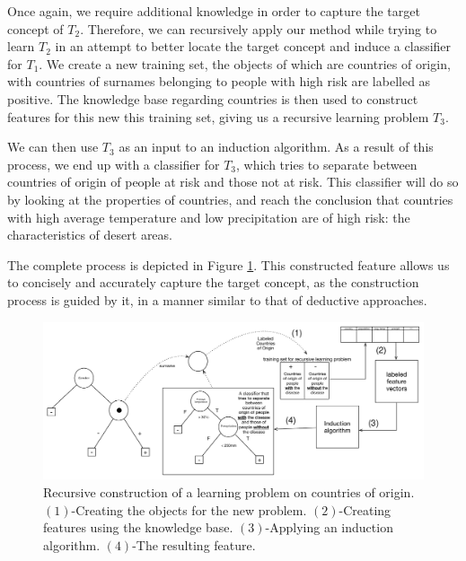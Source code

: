 \documentclass{article}
\theoremstyle{definition}
\begin{document}
Once again, we require additional knowledge in order to capture the target concept of $T_2$. 
Therefore, we can recursively apply our method while trying to learn $T_2$ in an attempt to better locate the target concept and induce a classifier for $T_1$.
We create a new training set, the objects of which are countries of origin, with countries of surnames belonging to people with high risk are labelled as positive. The knowledge base regarding countries is then used to construct features for this new this training set, giving us a recursive learning problem $T_3$.

We can then use $T_3$ as an input to an induction algorithm. As a result of this process, we end up with a classifier for $T_3$, which tries to separate between countries of origin of people at risk and those not at risk. This classifier will do so by looking at the properties of countries, and reach the conclusion that countries with high average temperature and low precipitation are of high risk: the characteristics of desert areas.

The complete process is depicted in Figure \ref{fig:moving_to_lvl2}. %
This constructed feature allows us to concisely and accurately capture the target concept, as the construction process is guided by it, in a manner similar to that of deductive approaches.


\begin{figure}[th]
	\centering
	\includegraphics[width=0.9\linewidth,height=0.33\linewidth]{fig4_annotated.pdf}
	\caption{Recursive construction of a learning problem on countries of origin. $(1)$-Creating the objects for the new problem. $(2)$-Creating features using the knowledge base. $(3)$-Applying an induction algorithm. $(4)$-The resulting feature.}
	\label{fig:moving_to_lvl2}
\end{figure}
\end{document}
